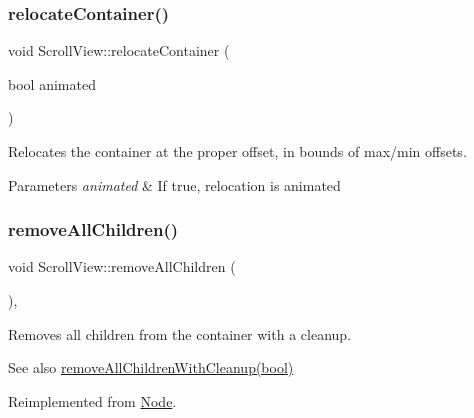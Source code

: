 \subsubsection{\texorpdfstring{relocate\+Container()}{relocateContainer()}\hspace{0.1cm}{\footnotesize\ttfamily [2/2]}}
{\footnotesize\ttfamily void Scroll\+View\+::relocate\+Container (\begin{DoxyParamCaption}\item[{bool}]{animated }\end{DoxyParamCaption})\hspace{0.3cm}{\ttfamily [protected]}}

Relocates the container at the proper offset, in bounds of max/min offsets.


\begin{DoxyParams}{Parameters}
{\em animated} & If true, relocation is animated \\
\hline
\end{DoxyParams}
\mbox{\label{classScrollView_aaef2d3ce7b1b7d485af4a3657bea17e5}} 
\subsubsection{\texorpdfstring{remove\+All\+Children()}{removeAllChildren()}\hspace{0.1cm}{\footnotesize\ttfamily [1/2]}}
{\footnotesize\ttfamily void Scroll\+View\+::remove\+All\+Children (\begin{DoxyParamCaption}{ }\end{DoxyParamCaption})\hspace{0.3cm}{\ttfamily [override]}, {\ttfamily [virtual]}}

Removes all children from the container with a cleanup.

\begin{DoxySeeAlso}{See also}
{\ttfamily \hyperlink{classScrollView_ac71d0fe89be6291abbccf6a6f8f011b4}{remove\+All\+Children\+With\+Cleanup(bool)}} 
\end{DoxySeeAlso}


Reimplemented from \hyperlink{classNode_a0f6ef5518d2e5dd5be405e98b37ace4a}{Node}.

\mbox{\label{classScrollView_a6a3b9ea8f88bca7ad741b511de369f24}} 
